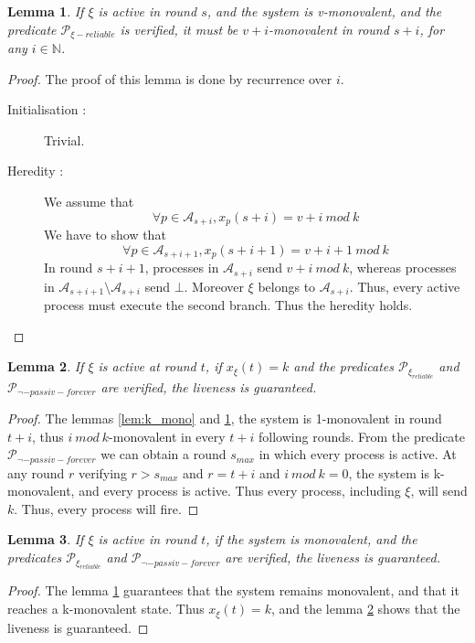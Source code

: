 \documentclass{article}
\newtheorem{lemma}{Lemma}[section]
\begin{document}
\begin{lemma}\label{lem:mono_mono}
	If $\xi$ is active in round $s$, and the system is v-monovalent, and the predicate $\mathcal{P}_{\xi-reliable}$ is verified, it must be $v+i$-monovalent in round $s+i$,
	for any $i \in \mathds{N}$.
\end{lemma}
\begin{proof}
	The proof of this lemma is done by recurrence over $i$.
	\begin{description}
		\item[Initialisation :] Trivial.
		\item[Heredity :] We assume that
			$$\forall p \in \mathcal{A}_{s+i}, x_p(s+i) = v+i~mod~k$$
			We have to show that 
			$$\forall p \in \mathcal{A}_{s+i+1}, x_p(s+i+1) = v+i+1~mod~k$$
			In round $s+i+1$, processes in $\mathcal{A}_{s+i}$ send $v+i~mod~k$, whereas processes 
			in $\mathcal{A}_{s+i+1} \setminus \mathcal{A}_{s+i}$ send $\bot$.
			Moreover $\xi$ belongs to $\mathcal{A}_{s+i}$.
			Thus, every active process must execute the second branch.
			Thus the heredity holds.
	\end{description}
\end{proof}

\begin{lemma}\label{lem:k_liv}
	If $\xi$ is active at round $t$, if $x_\xi(t) = k$ and the predicates $\mathcal{P}_\xi_{reliable}$ and $\mathcal{P}_{\neg-passiv-forever}$ are verified, the liveness is guaranteed.
\end{lemma}
\begin{proof}
	The lemmas \ref{lem:k_mono} and \ref{lem:mono_mono}, the system is 1-monovalent in round $t+i$,
	thus $i~mod~k$-monovalent in every $t+i$ following rounds.
	From the predicate $\mathcal{P}_{\neg-passiv-forever}$ we can obtain a round $s_{max}$ in which every process is active.
	At any round $r$ verifying $r > s_{max}$ and $r = t + i$ and $i~mod~k = 0$, the system is k-monovalent,
	and every process is active. Thus every process, including $\xi$, will send $k$.
	Thus, every process will fire.
\end{proof}

\begin{lemma}\label{lem:mono_liv}
	If $\xi$ is active in round $t$, if the system is monovalent, and the predicates $\mathcal{P}_\xi_{reliable}$ and $\mathcal{P}_{\neg-passiv-forever}$ are verified, the liveness is guaranteed.
\end{lemma}
\begin{proof}
	The lemma \ref{lem:mono_mono} guarantees that the system remains monovalent, and that it reaches a
	k-monovalent state.
	Thus $x_\xi(t) = k$, and the lemma \ref{lem:k_liv} shows that the liveness is guaranteed.
\end{proof}
\end{document}
